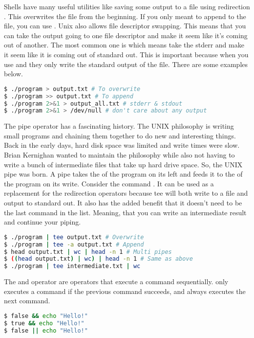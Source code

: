Shells have many useful utilities like saving some output to a file using redirection \keyword{>}.
This overwrites the file from the beginning.
If you only meant to append to the file, you can use \keyword{>>}.
Unix also allows file descriptor swapping.
This means that you can take the output going to one file descriptor and make it seem like it's coming out of another.
The most common one is  which means take the stderr and make it seem like it is coming out of standard out.
This is important because when you use \keyword{>} and \keyword{>>} they only write the standard output of the file.
There are some examples below.

\begin{lstlisting}[language=bash]
$ ./program > output.txt # To overwrite
$ ./program >> output.txt # To append
$ ./program 2>&1 > output_all.txt # stderr & stdout
$ ./program 2>&1 > /dev/null # don't care about any output
\end{lstlisting}

The pipe operator has a fascinating history.
The UNIX philosophy is writing small programs and chaining them together to do new and interesting things.
Back in the early days, hard disk space was limited and write times were slow.
Brian Kernighan wanted to maintain the philosophy while also not having to write a bunch of intermediate files that take up hard drive space.
So, the UNIX pipe was born.
A pipe takes the  of the program on its left and feeds it to the  of the program on its write.
Consider the command .
It can be used as a replacement for the redirection operators because tee will both write to a file and output to standard out.
It also has the added benefit that it doesn't need to be the last command in the list. Meaning, that you can write an intermediate result and continue your piping.

\begin{lstlisting}[language=bash]
$ ./program | tee output.txt # Overwrite
$ ./program | tee -a output.txt # Append
$ head output.txt | wc | head -n 1 # Multi pipes
$ ((head output.txt) | wc) | head -n 1 # Same as above
$ ./program | tee intermediate.txt | wc
\end{lstlisting}

The \keyword{&&} and \keyword{||} operator are operators that execute a command sequentially. \keyword{&&} only executes a command if the previous command succeeds, and \keyword{||} always executes the next command.

\begin{lstlisting}[language=bash]
$ false && echo "Hello!"
$ true && echo "Hello!"
$ false || echo "Hello!"
\end{lstlisting}

